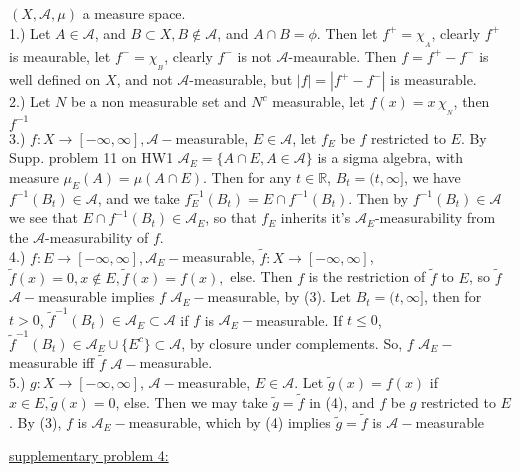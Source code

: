 \documentclass[12pt]{article}
\newcommand{\reals}[0] { \mathbb{R}}
\begin{document}
\begin{flushleft}
$(X,\mathcal A, \mu )$ a measure space. \\
1.) Let $A \in \mathcal A$, and $B \subset X, B \not \in \mathcal A$, and $A \cap B = \phi$. Then let $f^+ = \chi_{_A}$, clearly $f^+$ is meaurable, let $f^- = \chi_{_B}$, clearly $f^-$ is not $\mathcal A$-meaurable. Then $f = f^+ - f^-$ is well defined on $X$, and not $\mathcal A$-measurable, but $|f| = |f^+ - f^-|$  is measurable. \\
2.) Let $N$ be a non measurable set and $N^c$ measurable, let $f(x) = x \, \chi_{_{N}}$, then $f^{-1}$\\
3.) $f:X \rightarrow [-\infty,\infty], \mathcal A-$measurable, $E \in \mathcal A$, let $f_E$ be $f$ restricted to $E$. By Supp. problem 11 on HW1 $\mathcal A_E = \{ A \cap E, A \in \mathcal A \}$ is a sigma algebra, with measure $\mu_E(A) = \mu(A \cap E)$. Then for any $t \in \reals$, $B_t = (t,\infty]$, we have $f^{-1}(B_t) \in \mathcal A$, and we take $f_E^{-1}(B_t) = E \cap f^{-1}(B_t)$. Then by $f^{-1}(B_t) \in \mathcal A$ we see that $E \cap f^{-1}(B_t) \in \mathcal A_E$, so that $f_E$ inherits it's $\mathcal A_E$-measurability from the $\mathcal A$-measurability of $f$. \\
4.) $f:E \rightarrow [-\infty,\infty], \mathcal A_E-$measurable, $\tilde f:X \rightarrow [-\infty,\infty]$, $\tilde f(x) = 0, x \not \in E, \tilde f(x) = f(x),$ else. Then $f$ is the restriction of $\tilde f$ to $E$, so $\tilde f$ $\mathcal A-$measurable  implies $f$ $\mathcal A_E-$measurable, by (3). 
Let $B_t = (t,\infty]$, then for $t > 0$, $\tilde f^{-1}(B_t) \in \mathcal A_E \subset \mathcal A$ if $ f$ is $\mathcal A_E-$measurable. If $t \le 0$, 
$\tilde f^{-1}(B_t) \in \mathcal A_E \cup \{ E^c \} \subset \mathcal A$, by closure under complements. So, $f$ $\mathcal A_E-$measurable  iff $\tilde f$ $\mathcal A-$measurable. \\
5.) $g:X \rightarrow [-\infty,\infty]$, $\mathcal A-$measurable, $E \in \mathcal A$. Let $\tilde g(x) = f(x)$ if $x \in E, \tilde g(x) = 0$, else. Then we may take $\tilde g = \tilde f$ in (4), and $f$ be $g$ restricted to $E$. By (3), $f$ is $\mathcal A_E-$measurable, which by (4) implies $\tilde g = \tilde f$ is $\mathcal A-$measurable
\end{flushleft}


\begin{flushleft}
\underline{supplementary problem 4:}
\end{flushleft}
\end{document}

